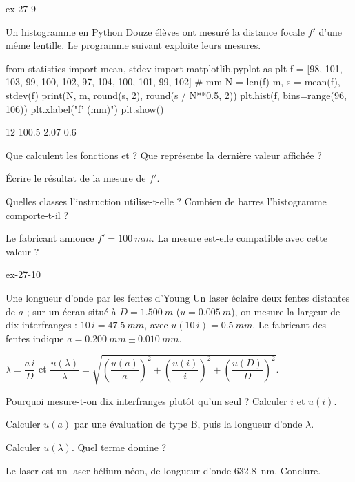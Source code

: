 \begin{blocLivre}{ex-27-9}
\begin{exercice}[2]{Un histogramme en Python}
Douze élèves ont mesuré la distance focale $f'$ d'une même lentille. Le programme suivant exploite leurs mesures.
\begin{codecote}[0.6]
\begin{pythoncol}
from statistics import mean, stdev
import matplotlib.pyplot as plt
f = [98, 101, 103, 99, 100, 102,
     97, 104, 100, 101, 99, 102]  # mm
N = len(f)
m, s = mean(f), stdev(f)
print(N, m, round(s, 2),
      round(s / N**0.5, 2))
plt.hist(f, bins=range(96, 106))
plt.xlabel("f' (mm)")
plt.show()
\end{pythoncol}
\cote
\begin{consolecol}
12 100.5 2.07 0.6
\end{consolecol}
\end{codecote}
\begin{questions}
\item {}Que calculent les fonctions  et  ? Que représente la dernière valeur affichée ?
\item Écrire le résultat de la mesure de $f'$.
\item Quelles classes l'instruction  utilise-t-elle ? Combien de barres l'histogramme
comporte-t-il ?
\item Le fabricant annonce $f'=\qty{100}{mm}$. La mesure est-elle compatible avec cette valeur ?
\end{questions}
\end{exercice}
\end{blocLivre}
\begin{blocLivre}{ex-27-10}
\begin{exercice}[2]{Une longueur d'onde par les fentes d'Young}
Un laser éclaire deux fentes distantes de $a$ ; sur un écran situé à $D=\qty{1,500}{m}$ ($u=\qty{0,005}{m}$), on mesure la largeur
de dix interfranges : $10\,i=\qty{47,5}{mm}$, avec $u(10\,i)=\qty{0,5}{mm}$. Le fabricant des fentes indique $a=\qty{0,200}{mm}\pm\qty{0,010}{mm}$.
\begin{donnees}
$\lambda=\dfrac{a\,i}{D}$ et $\dfrac{u(\lambda)}{\lambda}=\sqrt{\left(\dfrac{u(a)}{a}\right)^2+\left(\dfrac{u(i)}{i}\right)^2+\left(\dfrac{u(D)}{D}\right)^2}$.
\end{donnees}
\begin{questions}
\item Pourquoi mesure-t-on dix interfranges plutôt qu'un seul ? Calculer $i$ et $u(i)$.
\item Calculer $u(a)$ par une évaluation de type B, puis la longueur d'onde $\lambda$.
\item Calculer $u(\lambda)$. Quel terme domine ?
\item Le laser est un laser hélium-néon, de longueur d'onde \qty{632,8}{nm}. Conclure.
\end{questions}
\end{exercice}
\end{blocLivre}
